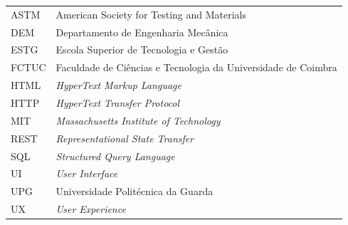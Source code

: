 \begin{longtable}{@{}p{3cm}l@{}}
    ASTM  & American Society for Testing and Materials \\[0.3cm]
    DEM   & Departamento de Engenharia Mecânica \\[0.3cm]
    ESTG  & Escola Superior de Tecnologia e Gestão \\[0.3cm]
    FCTUC & Faculdade de Ciências e Tecnologia da Universidade de Coimbra \\[0.3cm]
    HTML  & \textit{HyperText Markup Language} \\[0.3cm]
    HTTP  & \textit{HyperText Transfer Protocol} \\[0.3cm]
    MIT   & \textit{Massachusetts Institute of Technology} \\[0.3cm]
    REST  & \textit{Representational State Transfer} \\[0.3cm]
    SQL   & \textit{Structured Query Language} \\[0.3cm]
    UI    & \textit{User Interface} \\[0.3cm]
    UPG   & Universidade Politécnica da Guarda \\[0.3cm]
    UX    & \textit{User Experience} \\
\end{longtable}

\cleardoublepage
